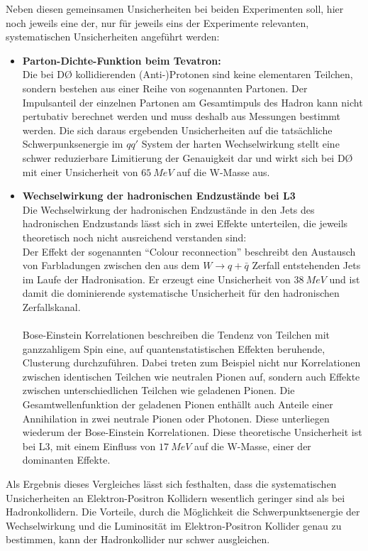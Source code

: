 \documentclass[a4paper,12pt]{article}
\begin{document}
Neben diesen gemeinsamen Unsicherheiten bei beiden Experimenten soll, hier noch jeweils eine der, nur für jeweils eins der Experimente relevanten,
systematischen Unsicherheiten angeführt werden:
\begin{itemize}
	\item \textbf{Parton-Dichte-Funktion beim Tevatron:}\\
	Die bei DØ kollidierenden (Anti-)Protonen sind keine elementaren Teilchen, sondern bestehen aus einer Reihe von sogenannten Partonen. Der
	Impulsanteil der einzelnen Partonen am Gesamtimpuls des Hadron kann nicht pertubativ berechnet werden und muss deshalb aus Messungen bestimmt
	werden. Die sich daraus ergebenden Unsicherheiten auf die tatsächliche Schwerpunksenergie im $qq'$ System der harten Wechselwirkung stellt eine
	schwer reduzierbare Limitierung der Genauigkeit dar und wirkt sich bei DØ mit einer Unsicherheit von $\SI{65}{MeV}$ auf die W-Masse aus.
	\item \textbf{Wechselwirkung der hadronischen Endzustände bei L3}\\
	Die Wechselwirkung der hadronischen Endzustände in den Jets des hadronischen Endzustands lässt sich in zwei Effekte unterteilen, die jeweils
	theoretisch noch nicht ausreichend verstanden sind: \\
	Der Effekt der sogenannten "`Colour reconnection"' beschreibt den Austausch von Farbladungen zwischen
	den aus dem $W\rightarrow q+\bar{q}$ Zerfall entstehenden Jets im Laufe der Hadronisation. Er erzeugt eine Unsicherheit von $\SI{38}{MeV}$
	und ist damit die dominierende systematische Unsicherheit für den hadronischen Zerfallskanal.\\
	\\
	Bose-Einstein Korrelationen beschreiben die Tendenz von Teilchen mit ganzzahligem Spin eine, auf quantenstatistischen Effekten beruhende, Clusterung
	durchzuführen. Dabei treten zum Beispiel nicht nur Korrelationen zwischen identischen Teilchen wie neutralen Pionen auf, sondern auch Effekte zwischen
	unterschiedlichen Teilchen wie geladenen Pionen. Die Gesamtwellenfunktion der geladenen Pionen enthällt auch Anteile einer Annihilation in
	zwei neutrale Pionen oder Photonen. Diese unterliegen	wiederum der Bose-Einstein Korrelationen.
	 Diese theoretische Unsicherheit ist bei L3, mit einem Einfluss von $\SI{17}{MeV}$ auf die W-Masse,
	einer der dominanten Effekte.
\end{itemize}
Als Ergebnis dieses Vergleiches lässt sich festhalten, dass die systematischen Unsicherheiten an Elektron-Positron Kollidern wesentlich geringer sind als
bei Hadronkollidern. Die Vorteile, durch die Möglichkeit die Schwerpunktsenergie der Wechselwirkung und die Luminosität im Elektron-Positron Kollider genau zu bestimmen, kann der Hadronkollider nur schwer ausgleichen.
\end{document}
